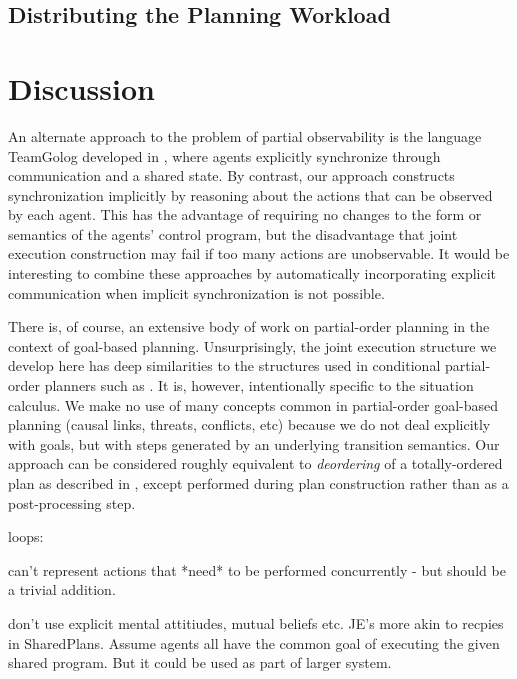 \subsection{Distributing the Planning Workload}


\section{Discussion\label{sec:JointExec:Discussion}}

An alternate approach to the problem of partial observability is the
language TeamGolog developed in \citep{farinelli07team_golog}, where
agents explicitly synchronize through communication and a shared state.
By contrast, our approach constructs synchronization implicitly by
reasoning about the actions that can be observed by each agent. This
has the advantage of requiring no changes to the form or semantics
of the agents' control program, but the disadvantage that joint execution
construction may fail if too many actions are unobservable. It would
be interesting to combine these approaches by automatically incorporating
explicit communication when implicit synchronization is not possible.

There is, of course, an extensive body of work on partial-order planning
in the context of goal-based planning. Unsurprisingly, the joint execution
structure we develop here has deep similarities to the structures
used in conditional partial-order planners such as \citep{peot92conditional_nonlinear}.
It is, however, intentionally specific to the situation calculus.
We make no use of many concepts common in partial-order goal-based
planning (causal links, threats, conflicts, etc) because we do not
deal explicitly with goals, but with steps generated by an underlying
transition semantics. Our approach can be considered roughly equivalent
to \emph{deordering} of a totally-ordered plan as described in \citep{backstrom99reordering},
except performed during plan construction rather than as a post-processing
step.

loops: \citep{levesque96what_is_planning,levesque05planning_with_loops}

can't represent actions that {*}need{*} to be performed concurrently
- but should be a trivial addition.

don't use explicit mental attitiudes, mutual beliefs etc. JE's more
akin to recpies in SharedPlans. Assume agents all have the common
goal of executing the given shared program. But it could be used as
part of larger system.

